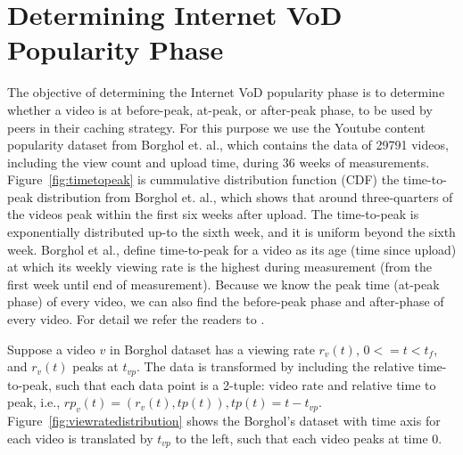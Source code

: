 \documentclass[10pt,final,journal,a4paper]{IEEEtran}
\begin{document}
\section{Determining Internet VoD Popularity Phase}\label{popularity}

The objective of determining the Internet VoD popularity phase is to determine whether a video is at before-peak, at-peak, or after-peak phase, to be used by peers in their caching strategy.
For this purpose we use the Youtube content popularity dataset from Borghol et. al.,\cite{Borghol:2011:CMP:2039452.2039717}  which contains the data of 29791 videos, including the view count and upload time, during 36 weeks of measurements.
Figure~\ref{fig:timetopeak} is cummulative distribution function (CDF) the time-to-peak distribution from Borghol et. al.,\cite{Borghol:2011:CMP:2039452.2039717}  which shows that around three-quarters of the videos peak within the first six weeks after upload.
The time-to-peak is exponentially distributed up-to the sixth week, and it is uniform beyond the sixth week.
Borghol et al., \cite{Borghol:2011:CMP:2039452.2039717} define time-to-peak for a video as its age (time since upload) at which its weekly viewing rate is the highest during measurement (from the first week until end of measurement).
Because we know the peak time (at-peak phase) of every video, we can also find the before-peak phase and after-phase of every video. 
For detail we refer the readers to \cite{Borghol:2011:CMP:2039452.2039717}.

Suppose a video $v$ in Borghol dataset has a viewing rate $r_v(t)$, $0 <= t < t_f$, and $r_v(t)$ peaks at $t_{vp}$.
The data is transformed by including the relative time-to-peak, such that each data point is a 2-tuple: video rate and relative time to peak, i.e., $rp_v(t) = ( r_v(t), tp(t) ), tp(t) = t - t_{vp}$.
Figure~\ref{fig:viewratedistribution} shows the Borghol's dataset with time axis for each video is translated by $t_{vp}$ to the left, such that each video peaks at time $0$.


\end{document}
